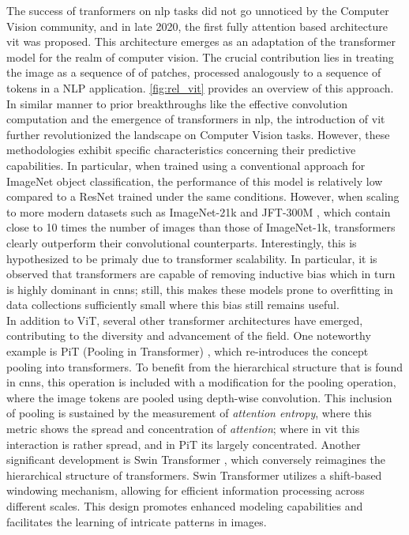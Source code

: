 \noindent The success of tranformers on \gls{nlp} tasks did not go unnoticed by the Computer Vision 
community, and in late 2020, the first fully attention based architecture \gls{vit} was proposed.
This architecture emerges as an adaptation of the transformer model for the realm of computer vision. 
The crucial contribution lies in treating the image as a sequence of of patches, processed 
analogously to a sequence of tokens in a NLP application. \autoref{fig:rel_vit} provides an 
overview of this approach.\\



\noindent In similar manner to prior breakthroughs like the effective convolution computation and the 
emergence of transformers in \gls{nlp}, the introduction of \gls{vit} further revolutionized the 
landscape on Computer Vision tasks. However, these methodologies exhibit specific characteristics 
concerning their predictive capabilities. In particular, when trained using a conventional 
approach for ImageNet object classification, the performance of this model is relatively low 
compared to a ResNet trained under the same conditions. However, when scaling to more modern 
datasets such as ImageNet-21k and JFT-300M \autocite{sun2017revisiting}, which contain close to 10 
times the number of images than those of ImageNet-1k, transformers clearly outperform their 
convolutional counterparts. Interestingly, this is hypothesized to be primaly due to transformer 
scalability. In particular, it is observed that transformers are capable of removing inductive bias 
which in turn is highly dominant in \glspl{cnn}; still, this makes these models prone to overfitting 
in data collections sufficiently small where this bias still remains useful.\\


In addition to ViT, several other transformer architectures have emerged, contributing to the 
diversity and advancement of the field. One noteworthy example is PiT (Pooling in Transformer) 
\autocite{heo2021rethinking}, which re-introduces the concept pooling into transformers. To benefit 
from the hierarchical structure that is found in \glspl{cnn}, this operation is included with 
a modification for the pooling operation, where the image tokens are  pooled using depth-wise 
convolution. This inclusion of pooling is sustained by the measurement of \emph{attention entropy}, 
where this metric shows the spread and concentration of \emph{attention}; where in \gls{vit} this 
interaction is rather spread, and in PiT its largely concentrated. Another significant 
development is Swin Transformer \autocite{liu2021swin}, which conversely reimagines the 
hierarchical structure of transformers. 
Swin Transformer utilizes a shift-based windowing mechanism, allowing for efficient information 
processing across different scales. This design promotes enhanced modeling capabilities and 
facilitates the learning of intricate patterns in images.\\

